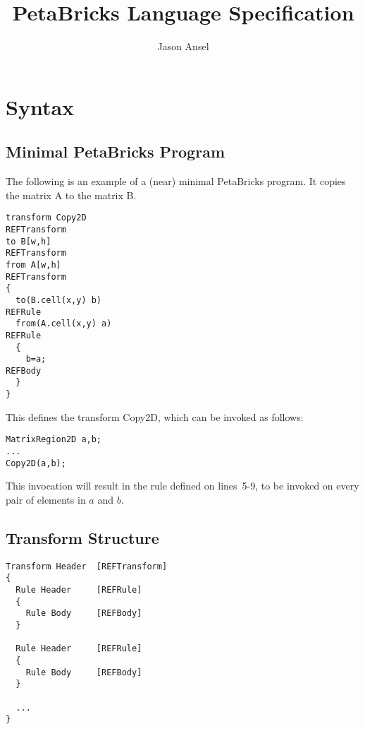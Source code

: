 \documentclass[11pt]{article}
\begin{document}
\title{PetaBricks Language Specification}
\author{Jason Ansel}
\maketitle
\tableofcontents

\newpage
\section{Syntax}

\subsection{Minimal PetaBricks Program}

The following is an example of a (near) minimal PetaBricks program. It
copies the matrix A to the matrix B.

\begin{lstlisting}
transform Copy2D                                                 REFTransform
to B[w,h]                                                        REFTransform
from A[w,h]                                                      REFTransform
{
  to(B.cell(x,y) b)                                              REFRule
  from(A.cell(x,y) a)                                            REFRule  
  {                                          
    b=a;                                                         REFBody
  }                                         
}
\end{lstlisting}
This defines the transform Copy2D, which can be invoked as follows:

\begin{lstlisting}
MatrixRegion2D a,b;
...
Copy2D(a,b);
\end{lstlisting}

This invocation will result in the rule defined on lines~5-9, to be invoked
on every pair of elements in $a$ and $b$.

\subsection{Transform Structure}

\begin{lstlisting}
Transform Header  [REFTransform]
{
  Rule Header     [REFRule] 
  {                       
    Rule Body     [REFBody]
  }                      
  
  Rule Header     [REFRule] 
  {                       
    Rule Body     [REFBody]
  }                                         

  ...
}
\end{lstlisting}
\end{document}
